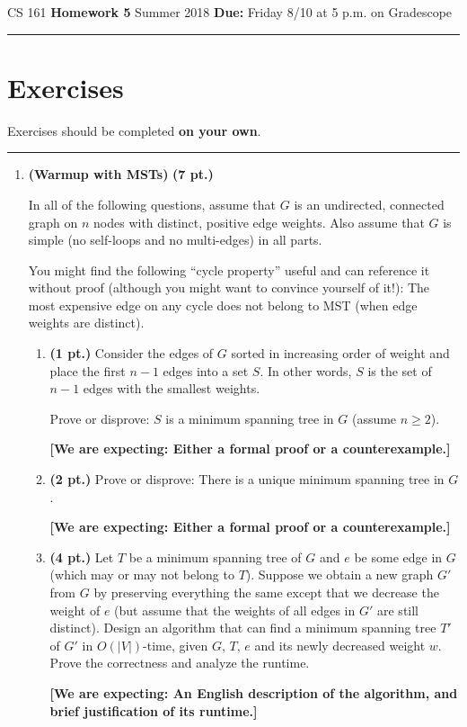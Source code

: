 \documentclass{article}
\begin{document}
\noindent
CS 161 \hfill \textbf{Homework 5} \newline 
Summer 2018 \hfill \textbf{Due:} Friday 8/10 at 5 p.m. on Gradescope

\noindent\rule{\linewidth}{0.4pt}

\section*{Exercises}

Exercises should be completed \textbf{on your own}.

\noindent\rule{\linewidth}{1.0pt}

\begin{enumerate}
  \item \textbf{(Warmup with MSTs)} \textbf{(7 pt.)}

    In all of the following questions, assume that $G$ is an undirected,
    connected graph on $n$ nodes with distinct, positive edge weights. Also
    assume that $G$ is simple (no self-loops and no multi-edges) in all parts.

    You might find the following ``cycle property'' useful and can reference it
    without proof (although you might want to convince yourself of it!): The
    most expensive edge on any cycle does not belong to MST (when edge weights
    are distinct).
    
    \begin{enumerate}
      \item \textbf{(1 pt.)} Consider the edges of $G$ sorted in increasing
        order of weight and place the first $n-1$ edges into a set $S$. In
        other words, $S$ is the set of $n-1$ edges with the smallest weights.
    
        Prove or disprove: $S$ is a minimum spanning tree in $G$ (assume
        $n \geq 2$).
    
        \textbf{[We are expecting: Either a formal proof or a counterexample.]}
    \item \textbf{(2 pt.)} Prove or disprove: There is a unique minimum
      spanning tree in $G$.
    
        \textbf{[We are expecting: Either a formal proof or a counterexample.]}
    \item \textbf{(4 pt.)} Let $T$ be a minimum spanning tree of $G$ and $e$
      be some edge in $G$ (which may or may not belong to $T$). Suppose we
      obtain a new graph $G'$ from $G$ by preserving everything the same except
      that we decrease the weight of $e$ (but assume that the weights of all
      edges in $G'$ are still distinct). Design an algorithm that can find a
      minimum spanning tree $T'$ of $G'$ in $O(|V|)$-time, given $G$, $T$, $e$
      and its newly decreased weight $w$. Prove the correctness and analyze the
      runtime.
    
      \textbf{[We are expecting: An English description of the algorithm, and
      brief justification of its runtime.]}
    \end{enumerate}
\end{enumerate}
\end{document}
